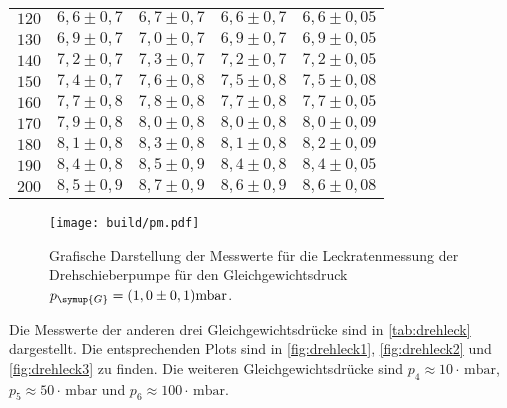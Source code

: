 \begin{table}[H]
\begin{tabular}{c c c c c}
    $120$ & $ 6,6 \pm 0,7 $ & $ 6,7 \pm 0,7 $ & $ 6,6 \pm 0,7 $& $ 6,6 \pm 0,05 $ \\ 
    $130$ & $ 6,9 \pm 0,7 $ & $ 7,0 \pm 0,7 $ & $ 6,9 \pm 0,7 $& $ 6,9 \pm 0,05 $ \\ 
    $140$ & $ 7,2 \pm 0,7 $ & $ 7,3 \pm 0,7 $ & $ 7,2 \pm 0,7 $& $ 7,2 \pm 0,05 $ \\ 
    $150$ & $ 7,4 \pm 0,7 $ & $ 7,6 \pm 0,8 $ & $ 7,5 \pm 0,8 $& $ 7,5 \pm 0,08 $ \\ 
    $160$ & $ 7,7 \pm 0,8 $ & $ 7,8 \pm 0,8 $ & $ 7,7 \pm 0,8 $& $ 7,7 \pm 0,05 $ \\ 
    $170$ & $ 7,9 \pm 0,8 $ & $ 8,0 \pm 0,8 $ & $ 8,0 \pm 0,8 $& $ 8,0 \pm 0,09 $ \\ 
    $180$ & $ 8,1 \pm 0,8 $ & $ 8,3 \pm 0,8 $ & $ 8,1 \pm 0,8 $& $ 8,2 \pm 0,09 $ \\ 
    $190$ & $ 8,4 \pm 0,8 $ & $ 8,5 \pm 0,9 $ & $ 8,4 \pm 0,8 $& $ 8,4 \pm 0,05 $ \\ 
    $200$ & $ 8,5 \pm 0,9 $ & $ 8,7 \pm 0,9 $ & $ 8,6 \pm 0,9 $& $ 8,6 \pm 0,08 $ \\ 
    \bottomrule
  \end{tabular}
\end{table}

\begin{figure}[H]
  \centering
  \texttt{[image: build/pm.pdf]}
  \caption{Grafische Darstellung der Messwerte für die Leckratenmessung der Drehschieberpumpe für den
  Gleichgewichtsdruck $p_{\symup{G}} = (1,0 \pm 0,1)\si{\milli\bar}$.}
  \label{fig:pm}
\end{figure}

Die Messwerte der anderen drei Gleichgewichtsdrücke sind in \autoref{tab:drehleck} dargestellt. Die entsprechenden
Plots sind in \autoref{fig:drehleck1}, \autoref{fig:drehleck2} und \autoref{fig:drehleck3} zu finden.
Die weiteren Gleichgewichtsdrücke sind
$p_4 \approx 10 \cdot \,\si{\milli\bar}$, $p_5 \approx 50 \cdot \,\si{\milli\bar}$ und
$p_6 \approx 100 \cdot \,\si{\milli\bar}$.

